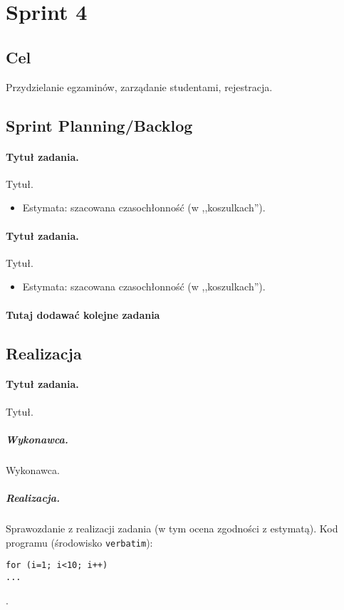 \documentclass[a4paper]{article}
\begin{document}
\section{Sprint 4}

\subsection{Cel} Przydzielanie egzaminów, zarządanie studentami, rejestracja. 

\subsection{Sprint Planning/Backlog}

\paragraph{Tytuł zadania.} Tytuł.
\begin{itemize}
\item Estymata: szacowana czasochłonność (w ,,koszulkach'').
\end{itemize}

\paragraph{Tytuł zadania.} Tytuł.
\begin{itemize}
\item Estymata: szacowana czasochłonność (w ,,koszulkach'').
\end{itemize}

\paragraph{Tutaj dodawać kolejne zadania}

\subsection{Realizacja}

\paragraph{Tytuł zadania.} Tytuł.
\subparagraph{Wykonawca.} Wykonawca.
\subparagraph{Realizacja.} Sprawozdanie z realizacji zadania (w tym ocena zgodności z estymatą). Kod programu (środowisko \texttt{verbatim}): \begin{verbatim}
for (i=1; i<10; i++)
...
\end{verbatim}.
\end{document}
